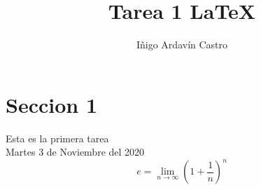 \documentclass[a4paper,10pt]{article}
\title{Tarea 1 LaTeX} %
\author{Iñigo Ardavín Castro} %
\begin{document}
\maketitle

% 

\section{Seccion 1}

Esta es la primera tarea \\ %

Martes 3 de Noviembre del 2020\\ %

\[ e = \lim_{n \to \infty} \left(1 + \frac{1}{n} \right)^n \]
\end{document}
